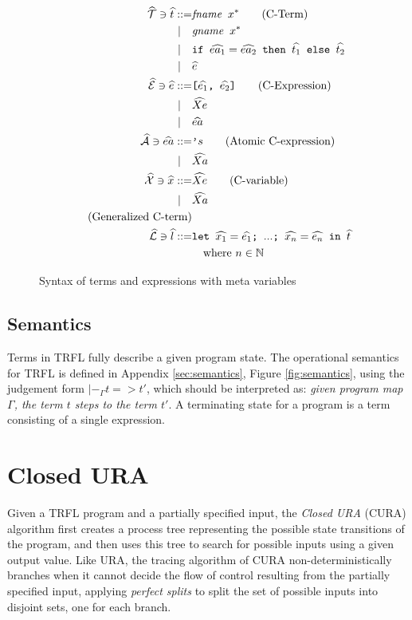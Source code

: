 \documentclass[10pt]{../sigplanconf}
\begin{document}
\begin{figure}\centering
  \begin{align*}
    \widehat{\mathcal{T}} \ni \widehat{t}
      ::=& \texttt{\textit{\rmfamily fname} $x^{*}$} \tag{C-Term} \\
    | \quad & \texttt{\textit{\rmfamily gname} $x^{*}$} \\
    | \quad & \texttt{if $\widehat{ea_1} = \widehat{ea_2}$ then $\widehat{t_1}$ else $\widehat{t_2}$} \\
    | \quad & \widehat{e} \\
    \widehat{\mathcal{E}} \ni \widehat{e} ::=& \texttt{[$\widehat{e_1}$, $\widehat{e_2}$]} \tag{C-Expression} \\
    | \quad & \widehat{Xe} \\
    | \quad & \widehat{ea} \\
    \widehat{\mathcal{A}} \ni \widehat{ea} ::= & \texttt{'}s \tag{Atomic C-expression} \\
    | \quad & \widehat{Xa} \\
    \widehat{\mathcal{X}} \ni \widehat{x} ::= & \widehat{Xe} \tag{C-variable} \\
    | \quad & \widehat{Xa} \\
    \tag{Generalized C-term} \\
    \widehat{\mathcal{L}} \ni \widehat{l} ::= & \texttt{let $\widehat{x_1} = \widehat{e_1}$; $...$; $\widehat{x_n} = \widehat{e_n}$ in $\widehat{t}$} \\
    & \quad \textrm{where}\ n \in \mathbb{N}
  \end{align*}

\caption{Syntax of terms and expressions with meta variables}
\label{fig:cbnf}
\end{figure}

\subsection{Semantics}
Terms in TRFL fully describe a given program state. The operational
semantics for TRFL is defined in Appendix \ref{sec:semantics}, Figure
\ref{fig:semantics}, using the judgement form $|-_\Gamma t => t'$,
which should be interpreted as: \textit{given program map $\Gamma$,
  the term $t$ steps to the term $t'$}. A terminating state for a
program is a term consisting of a single expression.

\section{Closed URA}
\label{sec:closed-ura}
Given a TRFL program and a partially specified input, the \emph{Closed
  URA} (CURA) algorithm first creates a process tree representing the
possible state transitions of the program, and then uses this tree to
search for possible inputs using a given output value. Like URA, the
tracing algorithm of CURA non-deterministically branches when it
cannot decide the flow of control resulting from the partially
specified input, applying \emph{perfect splits} to split the set of
possible inputs into disjoint sets, one for each branch.
\end{document}
